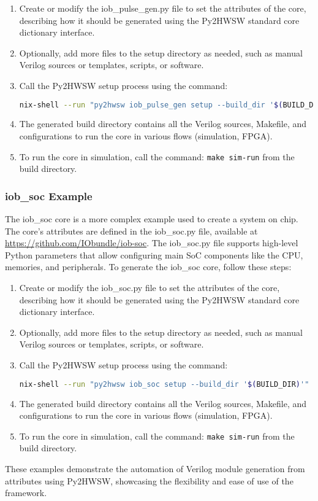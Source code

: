 \begin{enumerate}
\item Create or modify the iob\_pulse\_gen.py file to set the attributes of the core, describing how it should be generated using the Py2HWSW standard core dictionary interface.
\item Optionally, add more files to the setup directory as needed, such as manual Verilog sources or templates, scripts, or software.
\item Call the Py2HWSW setup process using the command:
\begin{lstlisting}[language=bash]
nix-shell --run "py2hwsw iob_pulse_gen setup --build_dir '$(BUILD_DIR)'"
\end{lstlisting}
\item The generated build directory contains all the Verilog sources, Makefile, and configurations to run the core in various flows (simulation, FPGA).
\item To run the core in simulation, call the command: \texttt{make sim-run} from the build directory.
\end{enumerate}

\subsubsection{iob\_soc Example}

The iob\_soc core is a more complex example used to create a system on chip. The core's attributes are defined in the iob\_soc.py file, available at \url{https://github.com/IObundle/iob-soc}. The iob\_soc.py file supports high-level Python parameters that allow configuring main SoC components like the CPU, memories, and peripherals. To generate the iob\_soc core, follow these steps:

\begin{enumerate}
\item Create or modify the iob\_soc.py file to set the attributes of the core, describing how it should be generated using the Py2HWSW standard core dictionary interface.
\item Optionally, add more files to the setup directory as needed, such as manual Verilog sources or templates, scripts, or software.
\item Call the Py2HWSW setup process using the command:
\begin{lstlisting}[language=bash]
nix-shell --run "py2hwsw iob_soc setup --build_dir '$(BUILD_DIR)'"
\end{lstlisting}
\item The generated build directory contains all the Verilog sources, Makefile, and configurations to run the core in various flows (simulation, FPGA).
\item To run the core in simulation, call the command: \texttt{make sim-run} from the build directory.
\end{enumerate}

These examples demonstrate the automation of Verilog module generation from attributes using Py2HWSW, showcasing the flexibility and ease of use of the framework.
